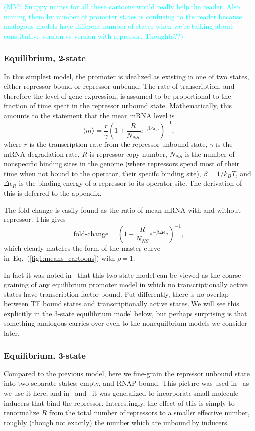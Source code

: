 \documentclass[12pt]{article}%
\newcommand{\mmnote}[1]{\textcolor{cyan}{(MM:~#1)}}
\newcommand{\eq}[1]{Eq.~(\ref{#1})}
\begin{document}
\mmnote{Snappy names for all these cartoons would really help the reader. Also naming them by number of promoter states is confusing to the reader because analogous models have different number of states when we're talking about constitutive version vs version with repressor. Thoughts??}

\subsubsection{Equilibrium, 2-state}
In this simplest model, the promoter is idealized as existing in
one of two states, either repressor bound or repressor unbound.
The rate of transcription, and therefore the level of gene
expression, is assumed to be proportional to the fraction of time
spent in the repressor unbound state.
Mathematically, this amounts to the statement that the mean mRNA level is
\begin{equation}
\langle m \rangle = \frac{r}{\gamma}
        \left(1 + \frac{R}{N_{NS}} e^{-\beta\Delta\epsilon_R}\right)^{-1},
\end{equation}
where $r$ is the transcription rate from the repressor unbound
state, $\gamma$ is the mRNA degradation rate, $R$ is repressor
copy number, $N_{NS}$ is the number of nonspecific binding sites
in the genome (where repressors spend most of their time when not
bound to the operator, their specifc binding site),
$\beta=1/k_BT$, and $\Delta\epsilon_R$ is the binding energy of a
repressor to its operator site. The derivation of this is deferred
to the appendix.

The fold-change is easily found as the ratio of mean mRNA with
and without repressor. This gives
\begin{equation}
\text{fold-change}
= \left(1 + \frac{R}{N_{NS}} e^{-\beta\Delta\epsilon_R}\right)^{-1},
\end{equation}
which clearly matches the form of the master curve
in~\eq{fig1:means_cartoons} with $\rho=1$.

In fact it was noted in~\cite{Chure2019} that this two-state
model can be viewed as the coarse-graining of any equilibrium
promoter model in which no transcriptionally active states have
transcription factor bound. Put differently, there is no overlap
between TF bound states and transcriptionally active states. We
will see this explicitly in the 3-state equilibrium model below,
but perhaps surprising is that something analogous carries over
even to the nonequilbrium models we consider later.

\subsubsection{Equilibrium, 3-state}
Compared to the previous model, here we fine-grain the repressor
unbound state into two separate states: empty, and RNAP bound.
This picture was used in~\cite{Garcia2011a} as we use it here,
and in~\cite{Razo-Mejia2018} and~\cite{Chure2019} it was generalized
to incorporate small-molecule inducers that bind the repressor.
Interestingly, the effect of this is simply to renormalize $R$
from the total number of repressors to a smaller effective number,
roughly (though not exactly) the number which are unbound by inducers.
\end{document}
